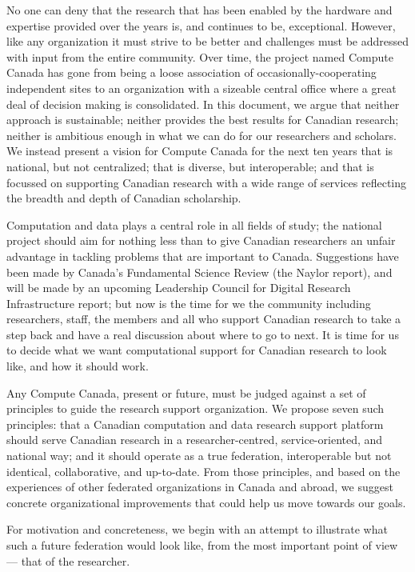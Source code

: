 \documentclass[11pt, letterpaper, twoside]{article}
\begin{document}
No one can deny that the research that has been enabled by the hardware
and expertise provided over the years is, and continues to be,
exceptional. However, like any organization it must strive to be better
and challenges must be addressed with input from the entire community.
Over time, the project named Compute Canada has gone from being a loose
association of occasionally-cooperating independent sites to an
organization with a sizeable central office where a great deal of
decision making is consolidated. In this document, we argue that neither
approach is sustainable; neither provides the best results for Canadian
research; neither is ambitious enough in what we can do for our
researchers and scholars. We instead present a vision for Compute Canada
for the next ten years that is national, but not centralized; that is
diverse, but interoperable; and that is focussed on supporting Canadian
research with a wide range of services reflecting the breadth and depth
of Canadian scholarship.

Computation and data plays a central role in all fields of study; the
national project should aim for nothing less than to give Canadian
researchers an unfair advantage in tackling problems that are important
to Canada. Suggestions have been made by Canada's Fundamental Science
Review (the Naylor report), and will be made by an upcoming Leadership
Council for Digital Research Infrastructure report; but now is the time
for we the community including researchers, staff, the members and all
who support Canadian research to take a step back and have a real
discussion about where to go to next. It is time for us to decide what
we want computational support for Canadian research to look like, and
how it should work.

Any Compute Canada, present or future, must be judged against a set of
principles to guide the research support organization.  We propose seven
such principles: that a Canadian computation and data research support
platform should serve Canadian research in a researcher-centred,
service-oriented, and national way; and it should operate as a true
federation, interoperable but not identical, collaborative, and
up-to-date. From those principles, and based on the experiences of other
federated organizations in Canada and abroad, we suggest concrete
organizational improvements that could help us move towards our goals.

For motivation and concreteness, we begin with an attempt to illustrate
what such a future federation would look like, from the most important
point of view --- that of the researcher.
\end{document}
